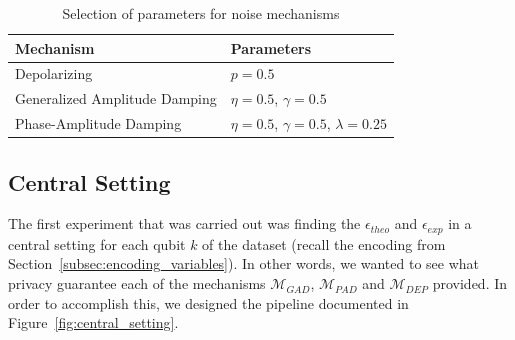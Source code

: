 \documentclass{ieeeaccess}
\begin{document}
\begin{table}[H]
  \caption{Selection of parameters for noise mechanisms}
  \label{tab:noise_params}
  \centering
  \begin{tabular}{ll}
    \toprule
    Mechanism & Parameters\\
    \midrule
    Depolarizing & $p = 0.5$ \\
    Generalized Amplitude Damping & $\eta = 0.5$, $\gamma = 0.5$ \\
    Phase-Amplitude Damping & $\eta = 0.5$, $\gamma = 0.5$, $\lambda = 0.25$ \\
    \bottomrule
  \end{tabular}
\end{table}

\subsection{Central Setting}
\label{subsec:experiment_central_setting}

The first experiment that was carried out was finding the $\epsilon_{theo}$ and $\epsilon_{exp}$ in a central setting for each qubit $k$ of the dataset (recall the encoding from Section~\ref{subsec:encoding_variables}). In other words, we wanted to see what privacy guarantee each of the mechanisms $\mathcal{M}_{GAD}$, $\mathcal{M}_{PAD}$ and $\mathcal{M}_{DEP}$ provided. In order to accomplish this, we designed the pipeline documented in Figure~\ref{fig:central_setting}.
\end{document}
